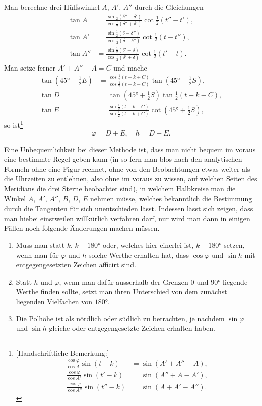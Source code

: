 \documentclass[10pt,a4paper]{article}
\begin{document}
Man berechne drei Hülfswinkel $A$, $A'$, $A''$ durch die Gleichungen
\begin{align*}
\tan A &= \frac{\sin\tfrac{1}{2}(\delta'' - \delta')}{\cos\tfrac{1}{2}(\delta'' + \delta')} \cot\tfrac{1}{2}(t'' - t'),\\
\tan A' &= \frac{\sin\tfrac{1}{2}(\delta - \delta'')}{\cos\tfrac{1}{2}(\delta + \delta'')} \cot\tfrac{1}{2}(t - t''),\\
\tan A'' &= \frac{\sin\tfrac{1}{2}(\delta' - \delta)}{\cos\tfrac{1}{2}(\delta' + \delta)} \cot\tfrac{1}{2}(t' - t).
\end{align*}
Man setze ferner $A' + A'' - A = C$ und mache
\begin{align*}
\tan(45° + \tfrac{1}{2}E) &= \frac{\cos\tfrac{1}{2}(t - k + C)}{\cos\tfrac{1}{2}(t - k - C)} \tan(45° + \tfrac{1}{2}S),\\
\tan D &= \tan(45° + \tfrac{1}{2}S) \tan\tfrac{1}{2}(t - k - C),\\
\tan E &= \frac{\sin\tfrac{1}{2}(t - k - C)}{\sin\tfrac{1}{2}(t - k + C)} \cot(45° + \tfrac{1}{2}S),
\end{align*}
so ist\footnote{[Handschriftliche Bemerkung:]
\begin{align*}
\frac{\cos\varphi}{\cos A} \sin(t - k) &= \sin(A' + A'' - A),\\
\frac{\cos\varphi}{\cos A'} \sin(t' - k) &= \sin(A'' + A - A'),\\
\frac{\cos\varphi}{\cos A''} \sin(t'' - k) &= \sin(A + A' - A'').\end{align*}}
\[
\varphi = D + E, \quad h = D - E.
\]

Eine Unbequemlichkeit bei dieser Methode ist, dass man nicht bequem im voraus eine bestimmte Regel geben kann (in so fern man blos nach den analytischen Formeln ohne eine Figur rechnet, ohne von den Beobachtungen etwas weiter als die Uhrzeiten zu entlehnen, also ohne im voraus zu wissen, auf welchen Seiten des Meridians die drei Sterne beobachtet sind), in welchem Halbkreise man die Winkel $A$, $A'$, $A''$, $B$, $D$, $E$ nehmen müsse, welches bekanntlich die Bestimmung durch die Tangenten für sich unentschieden lässt. Indessen lässt sich zeigen, dass man hiebei einstweilen willkürlich verfahren darf, nur wird man dann in einigen Fällen noch folgende Änderungen machen müssen.

\begin{enumerate}
\item Muss man statt $k$, $k + 180°$ oder, welches hier einerlei ist, $k - 180°$ setzen, wenn man für $\varphi$ und $h$ solche Werthe erhalten hat, dass $\cos\varphi$ und $\sin h$ mit entgegengesetzten Zeichen afficirt sind.
\item Statt $h$ und $\varphi$, wenn man dafür ausserhalb der Grenzen $0$ und $90°$ liegende Werthe finden sollte, setzt man ihren Unterschied von dem zunächst liegenden Vielfachen von $180°$.
\item Die Polhöhe ist als nördlich oder südlich zu betrachten, je nachdem $\sin\varphi$ und $\sin h$ gleiche oder entgegengesetzte Zeichen erhalten haben.
\end{enumerate}
\end{document}
